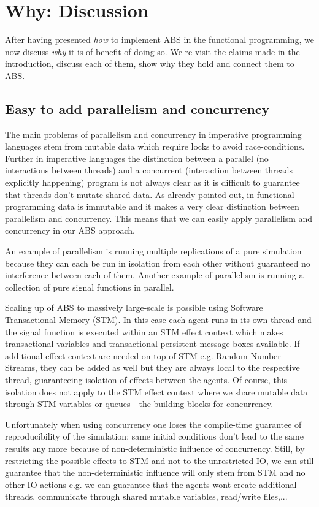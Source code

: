 \section{Why: Discussion}
After having presented \textit{how} to implement ABS in the functional programming, we now discuss \textit{why} it is of benefit of doing so. We re-visit the claims made in the introduction, discuss each of them, show why they hold and connect them to ABS.

\subsection{Easy to add parallelism and concurrency}
The main problems of parallelism and concurrency in imperative programming languages stem from mutable data which require locks to avoid race-conditions. Further in imperative languages the distinction between a parallel (no interactions between threads) and a concurrent (interaction between threads explicitly happening) program is not always clear as it is difficult to guarantee that threads don't mutate shared data. As already pointed out, in functional programming data is immutable and it makes a very clear distinction between parallelism and concurrency. This means that we can easily apply parallelism and concurrency in our ABS approach.

An example of parallelism is running multiple replications of a pure simulation because they can each be run in isolation from each other without guaranteed no interference between each of them. Another example of parallelism is running a collection of pure signal functions in parallel.

Scaling up of ABS to massively large-scale is possible using Software Transactional Memory (STM). In this case each agent runs in its own thread and the signal function is executed within an STM effect context which makes transactional variables and transactional persistent message-boxes available.  If additional effect context are needed on top of STM e.g. Random Number Streams, they can be added as well but they are always local to the respective thread, guaranteeing isolation of effects between the agents. Of course, this isolation does not apply to the STM effect context where we share mutable data through STM variables or queues - the building blocks for concurrency. 

Unfortunately when using concurrency one loses the compile-time guarantee of reproducibility of the simulation: same initial conditions don't lead to the same results any more because of non-deterministic influence of concurrency. Still, by restricting the possible effects to STM and not to the unrestricted IO, we can still guarantee that the non-deterministic influence will only stem from STM and no other IO actions e.g. we can guarantee that the agents wont create additional threads, communicate through shared mutable variables, read/write files,...

